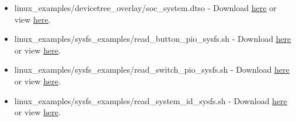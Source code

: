 \begin{flushleft}
\begin{enumerate}[
	label=\textbf{Step \arabic*.},
	leftmargin=*,
	widest={00},
	align=left]
\begin{itemize}
\item linux\_examples/devicetree\_overlay/soc\_system.dtso - Download \href{\TheRawURL/MyFirstHPSSystem/writeup_linux/devicetree_overlay/soc_system.dtso}{\underline{here}} or view \href{\TheBlobURL/MyFirstHPSSystem/writeup_linux/devicetree_overlay/soc_system.dtso}{\underline{here}}.

\item linux\_examples/sysfs\_examples/read\_button\_pio\_sysfs.sh - Download \href{\TheRawURL/MyFirstHPSSystem/writeup_linux/sysfs_examples/read_button_pio_sysfs.sh}{\underline{here}} or view \href{\TheBlobURL/MyFirstHPSSystem/writeup_linux/sysfs_examples/read_button_pio_sysfs.sh}{\underline{here}}.

\item linux\_examples/sysfs\_examples/read\_switch\_pio\_sysfs.sh - Download \href{\TheRawURL/MyFirstHPSSystem/writeup_linux/sysfs_examples/read_switch_pio_sysfs.sh}{\underline{here}} or view \href{\TheBlobURL/MyFirstHPSSystem/writeup_linux/sysfs_examples/read_switch_pio_sysfs.sh}{\underline{here}}.

\item linux\_examples/sysfs\_examples/read\_system\_id\_sysfs.sh - Download \href{\TheRawURL/MyFirstHPSSystem/writeup_linux/sysfs_examples/read_system_id_sysfs.sh}{\underline{here}} or view \href{\TheBlobURL/MyFirstHPSSystem/writeup_linux/sysfs_examples/read_system_id_sysfs.sh}{\underline{here}}.


\end{itemize}
\end{enumerate}
\end{flushleft}
